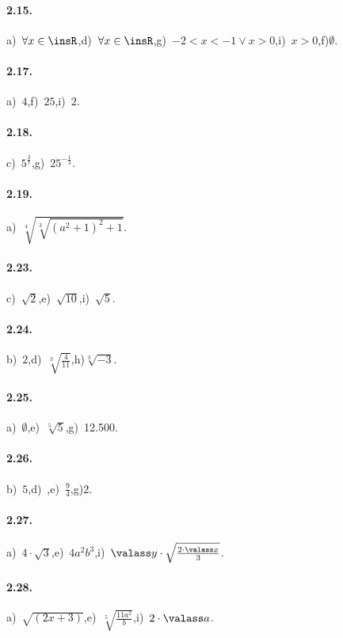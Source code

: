 \paragraph{2.15.}
a)~$\forall x\in \insR$,\quad d)~$\forall x\in \insR$,\quad g)~$-2<x<-1 \vee x>0$,\quad i)~$x>0$,\quad f)$\emptyset$.

\paragraph{2.17.}
a)~$4$,\quad f)~$25$,\quad i)~$2$.

\paragraph{2.18.}
c)~$5^{\frac 3 7}$,\quad g)~$25^{-\frac 1 3}$.

\paragraph{2.19.}
a)~$\sqrt[4]{\sqrt[3]{(a^2+1)^2+1}}$.

\paragraph{2.23.}
c)~$\sqrt 2$,\quad e)~$\sqrt{10}$,\quad i)~$\sqrt 5$.

\paragraph{2.24.}
b)~$2$,\quad d)~$\sqrt[3]{\frac 4{11}}$,\quad h)$\sqrt[3]{-3}$.

\paragraph{2.25.}
a)~$\emptyset$,\quad e)~$\sqrt[5]5$,\quad g)~12.500.

\paragraph{2.26.}
b)~$5$,\quad d)~,\quad e)~$\frac 9 4$,\quad g)$2$.

\paragraph{2.27.}
a)~$4\cdot \sqrt 3$,\quad e)~$4a^2b^3$,\quad i)~$\valass y \cdot \sqrt{\frac{2\cdot \valass x} 3}$.

\paragraph{2.28.}
a)~$\sqrt{(2x+3)}$,\quad e)~$\sqrt[5]{\frac{11a^2} b}$,\quad i)~$2\cdot \valass a$.

